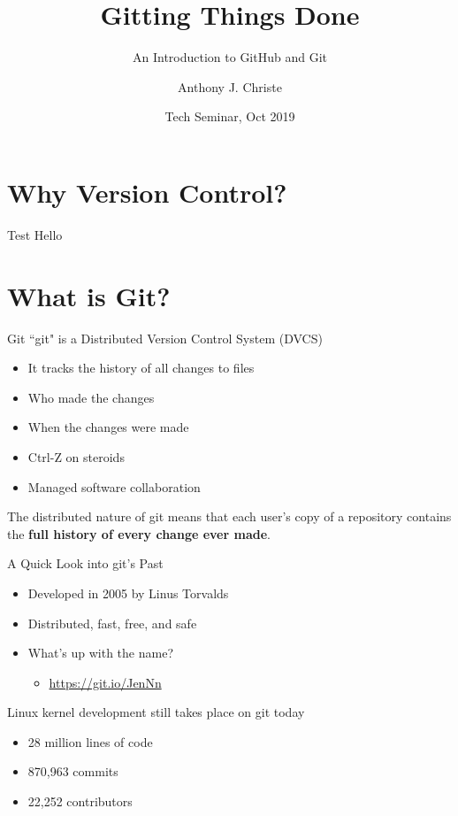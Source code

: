 \documentclass{beamer}
\title{Gitting Things Done}
\subtitle{An Introduction to GitHub and Git}
\author{Anthony J. Christe}
\date{Tech Seminar, Oct 2019}
\institute{PhD Candidate\\UH Manoa, ICS Department}
\begin{document}
    \maketitle

    \section{Why Version Control?}\label{sec:why-version-control?}
    \begin{frame}{Test}
        Hello
    \end{frame}

    \section{What is Git?}\label{sec:what-is-git?}
    \begin{frame}{Git}
        ``git" is a Distributed Version Control System (DVCS)

        \begin{itemize}
            \item It tracks the history of all changes to files
            \item Who made the changes
            \item When the changes were made
            \item Ctrl-Z on steroids
            \item Managed software collaboration
        \end{itemize}

        The distributed nature of git means that each user's copy of a repository contains the \textbf{full history of every change ever made}.
    \end{frame}

    \begin{frame}{A Quick Look into git's Past}
        \begin{itemize}
            \item Developed in 2005 by Linus Torvalds
            \item Distributed, fast, free, and safe
            \item What's up with the name?
            \begin{itemize}
                \item \url{https://git.io/JenNn}
            \end{itemize}
        \end{itemize}

        Linux kernel development still takes place on git today
        \begin{itemize}
            \item 28 million lines of code
            \item 870,963 commits
            \item 22,252 contributors
        \end{itemize}

    \end{frame}
\end{document}
